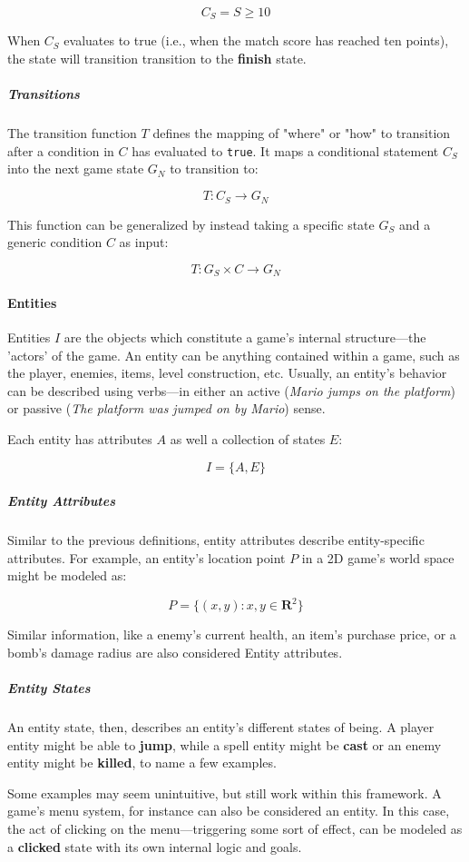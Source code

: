 \documentclass{report}
\begin{document}
$$
C_S = S\geq10 
$$

When $C_S$ evaluates to true (i.e., when the match score has reached ten points), the state will transition transition to the \textbf{finish} state.

\subparagraph{Transitions}
The transition function $T$ defines the mapping of "where" or "how" to transition after a condition in $C$ has evaluated to \texttt{true}. It maps a conditional statement $C_S$ into the next game state $G_N$ to transition to:

$$
T: C_S \longrightarrow G_N
$$

This function can be generalized by instead taking a specific state $G_S$ and a generic condition $C$ as input:

$$
T: G_S \times C \longrightarrow G_N
$$

\paragraph{Entities}
Entities $I$ are the objects which constitute a game's internal structure---the 'actors' of the game. An entity can be anything contained within a game, such as the player, enemies, items, level construction, etc.  Usually, an entity's behavior can be described using verbs---in either an active (\emph{Mario jumps on the platform}) or passive (\emph{The platform was jumped on by Mario}) sense.

Each entity has attributes $A$ as well a collection of states $E$:

$$I = \{A, E\}$$

\subparagraph{Entity Attributes}
Similar to the previous definitions, entity attributes describe entity-specific attributes. For example, an entity's location point $P$ in a 2D game's world space might be modeled as:

$$P = \{(x,y): x,y \in \mathbf{R} ^2\}$$ 

Similar information, like a enemy's current health, an item's purchase price, or a bomb's damage radius are also considered Entity attributes. 

\subparagraph{Entity States}
An entity state, then, describes an entity's different states of being. A player entity might be able to \textbf{jump}, while a spell entity might be \textbf{cast} or an enemy entity might be \textbf{killed}, to name a few examples. 

Some examples may seem unintuitive, but still work within this framework. A game's menu system, for instance can also be considered an entity. In this case, the act of clicking on the menu---triggering some sort of effect, can be modeled as a \textbf{clicked} state with its own internal logic and goals. 
\end{document}
